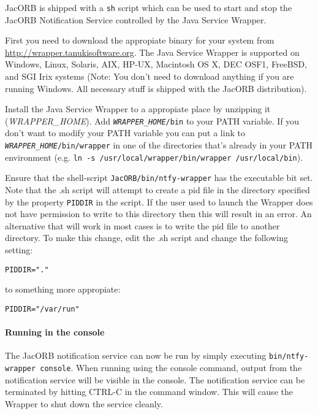JacORB is shipped with a \texttt{sh} script which can be used to start
and stop the JacORB Notification Service controlled by the Java
Service Wrapper.

First you need to download the appropiate binary for your system from
\href{http://wrapper.tanukisoftware.org}{http://wrapper.tanukisoftware.org}.
The Java Service Wrapper is supported on Windows, Linux, Solaris, AIX,
HP-UX, Macintosh OS X, DEC OSF1, FreeBSD, and SGI Irix systems (Note:
You don't need to download anything if you are running Windows. All
necessary stuff is shipped with the JacORB distribution).

Install the Java Service Wrapper to a appropiate place by unzipping it 
(\emph{WRAPPER\_HOME}). Add
\texttt{\emph{WRAPPER\_HOME}/bin} to your PATH variable. If you don't
want to modify your PATH variable you can put a link to
\texttt{\emph{WRAPPER\_HOME}/bin/wrapper} in one of the directories
that's already in your PATH environment (e.g. \texttt{ln -s
  /usr/local/wrapper/bin/wrapper /usr/local/bin}).

Ensure that the shell-script
\texttt{JacORB/bin/ntfy-wrapper} has the executable bit set. Note that
the .sh script will attempt to create a pid file in the directory
specified by the property \texttt{PIDDIR} in the script. If
the user used to launch the Wrapper does not have permission to write
to this directory then this will result in an error. An alternative
that will work in most cases is to write the pid file to another
directory. To make this change, edit the .sh script and change the following setting: 

\begin{verbatim}
PIDDIR="."
\end{verbatim}
to something more appropiate:
\begin{verbatim}
PIDDIR="/var/run"
\end{verbatim}

\paragraph{Running in the console}
\label{sec:running-console}

 The JacORB notification service  can now be run by simply executing
 \texttt{bin/ntfy-wrapper console}.
When running using the console command, output from the notification
 service will be visible in the console. 
 The notification service can be terminated by hitting CTRL-C in the command
 window. This will cause the Wrapper to shut down the service cleanly.  

